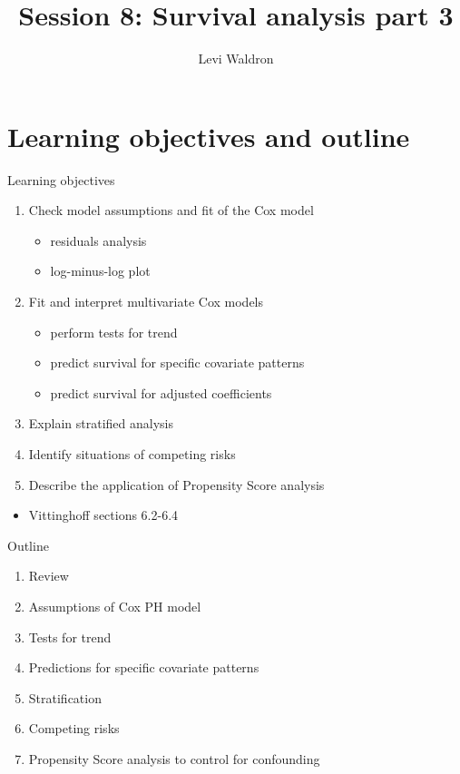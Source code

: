 \documentclass[
  ignorenonframetext,
]{beamer}
\title{Session 8: Survival analysis part 3}
\author{Levi Waldron}
\date{}
\institute{CUNY SPH Biostatistics 2}
\providecommand{\tightlist}{%
  \setlength{\itemsep}{0pt}\setlength{\parskip}{0pt}}
\begin{document}
\frame{\titlepage}

\hypertarget{learning-objectives-and-outline}{%
\section{Learning objectives and
outline}\label{learning-objectives-and-outline}}

\begin{frame}{Learning objectives}
\protect\hypertarget{learning-objectives}{}

\begin{enumerate}
\tightlist
\item
  Check model assumptions and fit of the Cox model

  \begin{itemize}
  \tightlist
  \item
    residuals analysis
  \item
    log-minus-log plot
  \end{itemize}
\item
  Fit and interpret multivariate Cox models

  \begin{itemize}
  \tightlist
  \item
    perform tests for trend
  \item
    predict survival for specific covariate patterns
  \item
    predict survival for adjusted coefficients
  \end{itemize}
\item
  Explain stratified analysis
\item
  Identify situations of competing risks
\item
  Describe the application of Propensity Score analysis
\end{enumerate}

\begin{itemize}
\tightlist
\item
  Vittinghoff sections 6.2-6.4
\end{itemize}

\end{frame}

\begin{frame}{Outline}
\protect\hypertarget{outline}{}

\begin{enumerate}
\tightlist
\item
  Review
\item
  Assumptions of Cox PH model
\item
  Tests for trend
\item
  Predictions for specific covariate patterns
\item
  Stratification
\item
  Competing risks
\item
  Propensity Score analysis to control for confounding
\end{enumerate}

\end{frame}
\end{document}
